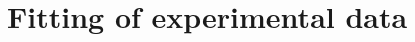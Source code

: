 \documentclass[11pt,titlepage,a4paper,twoside]{article}
\begin{document}



\section{Fitting of experimental data}
\end{document}

